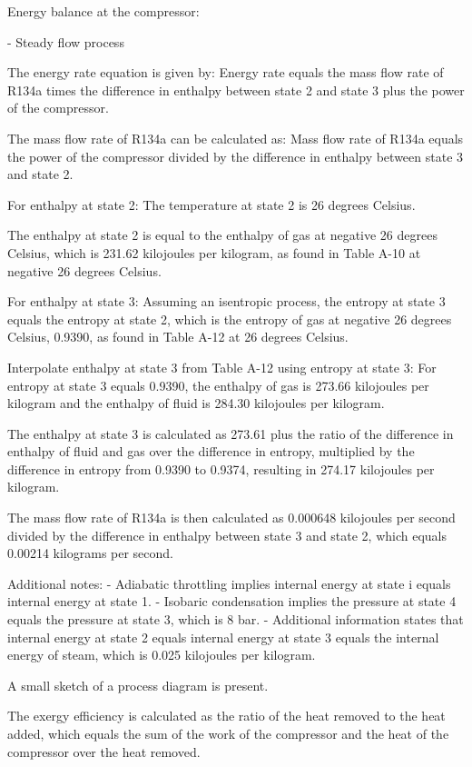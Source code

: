 Energy balance at the compressor:

- Steady flow process

The energy rate equation is given by:
Energy rate equals the mass flow rate of R134a times the difference in enthalpy between state 2 and state 3 plus the power of the compressor.

The mass flow rate of R134a can be calculated as:
Mass flow rate of R134a equals the power of the compressor divided by the difference in enthalpy between state 3 and state 2.

For enthalpy at state 2:
The temperature at state 2 is 26 degrees Celsius.

The enthalpy at state 2 is equal to the enthalpy of gas at negative 26 degrees Celsius, which is 231.62 kilojoules per kilogram, as found in Table A-10 at negative 26 degrees Celsius.

For enthalpy at state 3:
Assuming an isentropic process, the entropy at state 3 equals the entropy at state 2, which is the entropy of gas at negative 26 degrees Celsius, 0.9390, as found in Table A-12 at 26 degrees Celsius.

Interpolate enthalpy at state 3 from Table A-12 using entropy at state 3:
For entropy at state 3 equals 0.9390, the enthalpy of gas is 273.66 kilojoules per kilogram and the enthalpy of fluid is 284.30 kilojoules per kilogram.

The enthalpy at state 3 is calculated as 273.61 plus the ratio of the difference in enthalpy of fluid and gas over the difference in entropy, multiplied by the difference in entropy from 0.9390 to 0.9374, resulting in 274.17 kilojoules per kilogram.

The mass flow rate of R134a is then calculated as 0.000648 kilojoules per second divided by the difference in enthalpy between state 3 and state 2, which equals 0.00214 kilograms per second.

Additional notes:
- Adiabatic throttling implies internal energy at state i equals internal energy at state 1.
- Isobaric condensation implies the pressure at state 4 equals the pressure at state 3, which is 8 bar.
- Additional information states that internal energy at state 2 equals internal energy at state 3 equals the internal energy of steam, which is 0.025 kilojoules per kilogram.

A small sketch of a process diagram is present.

The exergy efficiency is calculated as the ratio of the heat removed to the heat added, which equals the sum of the work of the compressor and the heat of the compressor over the heat removed.